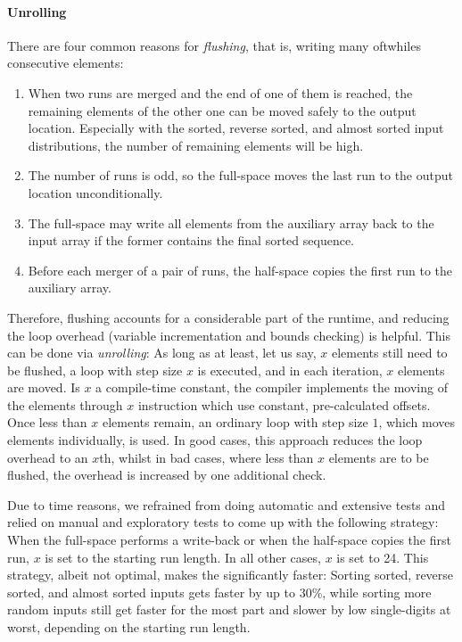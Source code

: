\paragraph{Unrolling}
There are four common reasons for \emph{flushing}, that is, writing \Dash many oftwhiles \Dash consecutive elements:
\begin{enumerate}
	\item
	When two runs are merged and the end of one of them is reached, the remaining elements of the other one can be moved safely to the output location.
	Especially with the sorted, reverse sorted, and almost sorted input distributions, the number of remaining elements will be high.

	\item
	The number of runs is odd, so the full-space \MS{} moves the last run to the output location unconditionally.

	\item
	The full-space \MS{} may write all elements from the auxiliary array back to the input array if the former contains the final sorted sequence.

	\item
	Before each merger of a pair of runs, the half-space \MS{} copies the first run to the auxiliary array.
\end{enumerate}
Therefore, flushing accounts for a considerable part of the runtime, and reducing the loop overhead (variable incrementation and bounds checking) is helpful.
This can be done via \emph{unrolling}:
As long as at least, let us say, \(x\) elements still need to be flushed, a loop with step size \(x\) is executed, and in each iteration, \(x\) elements are moved.
Is \(x\) a compile-time constant, the compiler implements the moving of the elements through \(x\) instruction which use constant, pre-calculated offsets.
Once less than \(x\) elements remain, an ordinary loop with step size \(1\), which moves elements individually, is used.
In good cases, this approach reduces the loop overhead to an \(x\)th, whilst in bad cases, where less than \(x\) elements are to be flushed, the overhead is increased by one additional check.

Due to time reasons, we refrained from doing automatic and extensive tests and relied on manual and exploratory tests to come up with the following strategy:
When the full-space \MS{} performs a write-back or when the half-space \MS{} copies the first run, \(x\) is set to the starting run length.
In all other cases, \(x\) is set to 24.
This strategy, albeit not optimal, makes the \MS*{} significantly faster:
Sorting sorted, reverse sorted, and almost sorted inputs gets faster by up to 30\%, while sorting more random inputs still get faster for the most part and slower by low single-digits at worst, depending on the starting run length.




